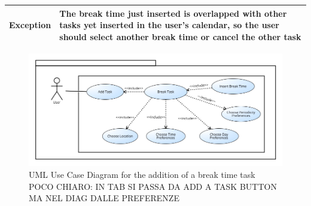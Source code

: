 \begin{table}[H]
\begin{tabular}{|p{3.5cm}|p{10.3cm}|}
    \hline
    \textbf{\large{Exception}} 			& The break time just inserted is overlapped with other tasks                                         yet inserted in the user's calendar, so the user should                                           select another break time or cancel the other task\\
    
    \hline
    
    
    \end{tabular}
	
\end{table}

\begin{figure}[H]
\centering
\includegraphics[scale=0.5]{Pictures/UseCaseDiagram/Add_a_break_time.png}
\caption{UML Use Case Diagram for the addition of a break time task POCO CHIARO: IN TAB SI PASSA DA ADD A TASK BUTTON MA NEL DIAG DALLE PREFERENZE}
\end{figure}
